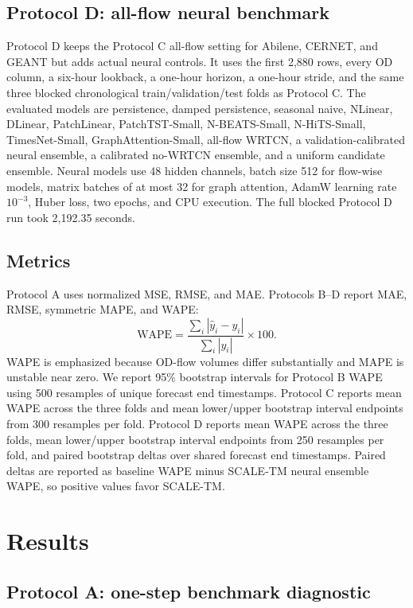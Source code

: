 \documentclass{article}
\begin{document}
\subsection{Protocol D: all-flow neural benchmark}

Protocol D keeps the Protocol C all-flow setting for Abilene, CERNET, and GEANT but adds actual neural controls. It uses the first 2,880 rows, every OD column, a six-hour lookback, a one-hour horizon, a one-hour stride, and the same three blocked chronological train/validation/test folds as Protocol C. The evaluated models are persistence, damped persistence, seasonal naive, NLinear, DLinear, PatchLinear, PatchTST-Small, N-BEATS-Small, N-HiTS-Small, TimesNet-Small, GraphAttention-Small, all-flow WRTCN, a validation-calibrated neural ensemble, a calibrated no-WRTCN ensemble, and a uniform candidate ensemble. Neural models use 48 hidden channels, batch size 512 for flow-wise models, matrix batches of at most 32 for graph attention, AdamW learning rate $10^{-3}$, Huber loss, two epochs, and CPU execution. The full blocked Protocol D run took 2,192.35 seconds.

\subsection{Metrics}

Protocol A uses normalized MSE, RMSE, and MAE. Protocols B--D report MAE, RMSE, symmetric MAPE, and WAPE:
\begin{equation}
  \mathrm{WAPE} =
  \frac{\sum_i |\hat{y}_i-y_i|}{\sum_i |y_i|}\times 100.
\end{equation}
WAPE is emphasized because OD-flow volumes differ substantially and MAPE is unstable near zero. We report 95\% bootstrap intervals for Protocol B WAPE using 500 resamples of unique forecast end timestamps. Protocol C reports mean WAPE across the three folds and mean lower/upper bootstrap interval endpoints from 300 resamples per fold. Protocol D reports mean WAPE across the three folds, mean lower/upper bootstrap interval endpoints from 250 resamples per fold, and paired bootstrap deltas over shared forecast end timestamps. Paired deltas are reported as baseline WAPE minus SCALE-TM neural ensemble WAPE, so positive values favor SCALE-TM.

\section{Results}

\subsection{Protocol A: one-step benchmark diagnostic}
\end{document}
